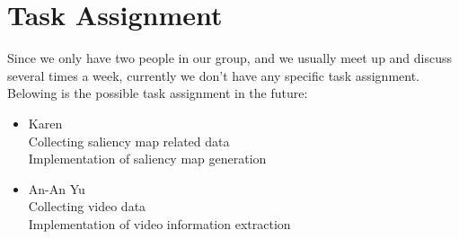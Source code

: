 \documentclass[12pt]{article}
\begin{document}
\section{Task Assignment}
Since we only have two people in our group, and we usually meet up and discuss several times a week, currently we don't have any specific task assignment.
Belowing is the possible task assignment in the future:
\begin{itemize}
	    \item Karen \\
                  Collecting saliency map related data \\
	              Implementation of saliency map generation
	    \item An-An Yu \\
	             Collecting video data \\
	             Implementation of video information extraction
\end{itemize}


\end{document}
